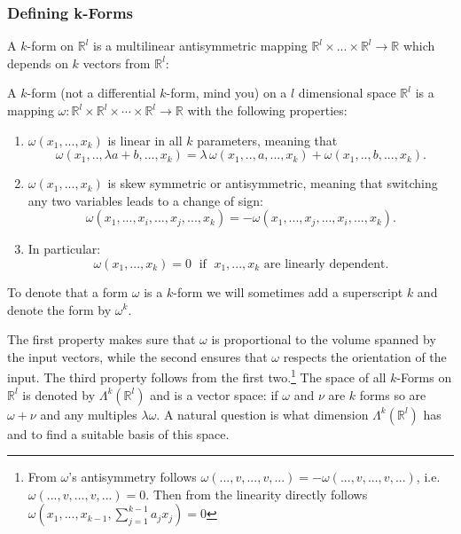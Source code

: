 \subsubsection{Defining k-Forms}
A $k$-form on $\mathbb R^l$ is a multilinear antisymmetric mapping $\mathbb R^l \times ... \times \mathbb R^l \to \mathbb R$ which depends on $k$ vectors from $\mathbb R^l$: 
\begin{definition}[$k$-form]
 A $k$-form (not a differential $k$-form, mind you) on a $l$ dimensional space $\mathbb R^l$ is a mapping $\omega : \mathbb R^l \times \mathbb R^l\times \cdots \times  \mathbb R^l \rightarrow \mathbb R$ with the following properties:
\begin{enumerate}
\item $\omega(x_1,...,x_k)$ is linear in all $k$ parameters, meaning that \[\omega(x_1,..,\lambda a + b,..., x_k) = \lambda\, \omega(x_1,..,a,..., x_k) + \omega(x_1,.., b,..., x_k).\]
\item $\omega(x_1,...,x_k)$ is skew symmetric or antisymmetric, meaning that switching any two variables leads to a change of sign:
\[\omega(x_1,...,x_i,...,x_j,...,x_k) = - \omega(x_1,...,x_j,...,x_i,...,x_k).\]
\item In particular:
\[\omega(x_1,...,x_k) = 0 \;\text{ if }\;x_1,...,x_k \text{ are linearly dependent.}\]
\end{enumerate}
To denote that a form $\omega$ is a $k$-form we will sometimes add a superscript $k$ and denote the form by $\omega^k$.
\end{definition}

The first property makes sure that $\omega$ is proportional to the volume spanned by the input vectors, while the second ensures that $\omega$ respects the orientation of the input.
The third property follows from the first two.\footnote{From $\omega$'s antisymmetry follows $\omega(...,v,...,v,...) = -\omega(...,v,...,v,...)$, i.e. $\omega(...,v,...,v,...) = 0$. Then from the linearity directly follows  $\omega(x_1,...,x_{k-1}, \sum_{j=1}^{k-1} a_jx_j) = 0$} The space of all $k$-Forms on $\mathbb R^l$ is denoted by $\Lambda^k (\mathbb R^l)$ and is a vector space: if $\omega$ and $\nu$ are $k$ forms so are $\omega + \nu$ and any multiples $\lambda \omega$. A natural question is what dimension $\Lambda^k(\mathbb R^l)$ has and to find a suitable basis of this space.

